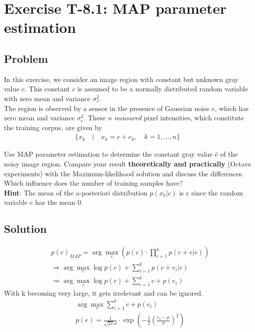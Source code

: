\section*{Exercise T-8.1: MAP parameter estimation}

\subsection*{Problem}
In this exercise, we consider an image region with constant but unknown gray value $c$.
This constant $c$ is assumed to be a normally distributed random variable with zero mean and variance $\sigma_c^2$.\\

The region is observed by a sensor in the presence of Gaussian noise $e$, which has zero mean and variance $\sigma_c^2$.
These\textit{ n measured} pixel intensities, which constitute the training corpus, are given by
\begin{align*}
	\{x_k\quad |\quad x_k = c + e_k,\quad k = 1,...,n\}
\end{align*}

Use MAP parameter estimation to determine the constant gray value $\hat{c}$ of the noisy image region.
Compare your result \textbf{theoretically and practically} (Octave experiments) with the Maximum-likelihood solution and discuss the differences.
Which influence does the number of training samples have?\\

\textbf{Hint}: The mean of the a-posteriori distribution $p(x_k|c)$ is c since the random variable $e$ has the mean 0.

\subsection*{Solution}
\begin{align*}
	&p(c)_{MAP}=\arg\max_c(p(c)\cdot\prod_{i=1}^{k} p(c+e|c))\\
	&\Rightarrow\arg\max_c \log p(c)+\sum_{i=1}^{k}p(c+e_i|c)\\
	&\Rightarrow\arg\max_c \log p(c)+\sum_{i=1}^{k}c+p(e_i)
\end{align*}
With k becoming very large, it gets irrelevant and can be ignored.
\begin{align*}
	&\arg\max_c\sum_{i=1}^{k}c+p(e_i)\\
	&p(e)=\frac{1}{\sqrt{2\pi}\sigma}\cdot\exp(-\frac{1}{2}(\frac{e_i-\mu}{\sigma})^2)
\end{align*}


